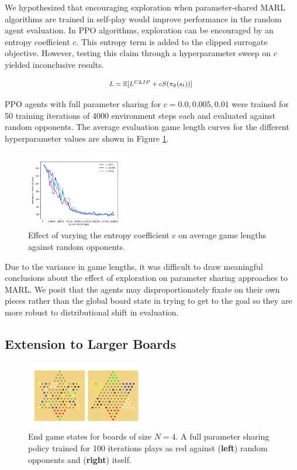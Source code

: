 \documentclass[12pt, a4paper, twocolumn]{article}
\begin{document}
We hypothesized that encouraging exploration when parameter-shared MARL algorithms are trained in self-play would improve performance in the random agent evaluation. In PPO algorithms, exploration can be encouraged by an entropy coefficient $c$. This entropy term is added to the clipped surrogate objective. However, testing this claim through a hyperparameter sweep on $c$ yielded inconclusive results.

$$
  \mbox{\footnotesize
  $L = \mathbb{E}[L^{CLIP} + cS(\pi_{\theta}(s_t))]$
  }
$$

PPO agents with full parameter sharing for $c = 0.0, 0.005, 0.01$ were trained for 50 training iterations of 4000 environment steps each and evaluated against random opponents. The average evaluation game length curves for the different hyperparameter values are shown in Figure \ref{fig:exploration}.

\begin{figure}[h]
\centering
    \includegraphics[width=0.4\textwidth]{images/exploration.png}
  \caption{Effect of varying the entropy coefficient $c$ on average game lengths against random opponents.}\label{fig:exploration}
\end{figure}

Due to the variance in game lengths, it was difficult to draw meaningful conclusions about the effect of exploration on parameter sharing approaches to MARL. We posit that the agents may disproportionately fixate on their own pieces rather than the global board state in trying to get to the goal so they are more robust to distributional shift in evaluation.

\subsection{Extension to Larger Boards}

\begin{figure}[h]
  \centering
    \includegraphics[width=0.47\textwidth]{images/larger_boards.png}
  \caption{End game states for boards of size $N = 4$. A full parameter sharing policy trained for 100 iterations plays as red against (\textbf{left}) random opponents and (\textbf{right}) itself.}\label{fig:largerboards}
\end{figure}
\end{document}
